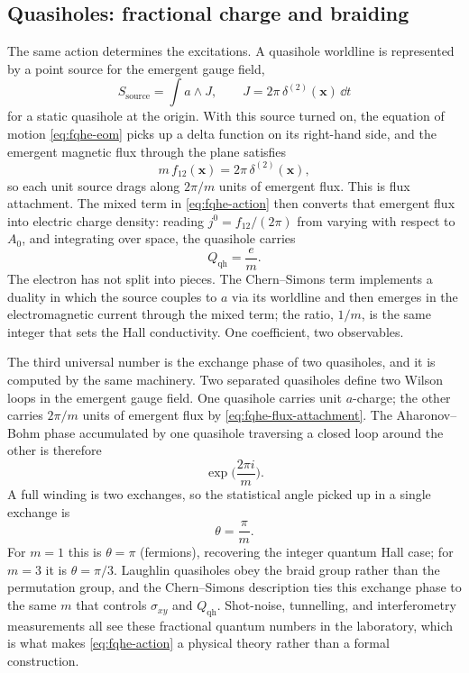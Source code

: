 \subsection{Quasiholes: fractional charge and braiding}
\label{subsec:fqhe-quasiholes}

The same action determines the excitations. A quasihole worldline is represented by a point source for the emergent gauge field,
\begin{equation}
  S_{\mathrm{source}} = \int a\wedge J,
  \qquad
  J = 2\pi\,\delta^{(2)}(\mathbf{x})\,\dd t
  \label{eq:fqhe-source}
\end{equation}
for a static quasihole at the origin. With this source turned on, the equation of motion \eqref{eq:fqhe-eom} picks up a delta function on its right-hand side, and the emergent magnetic flux through the plane satisfies
\begin{equation}
  m\,f_{12}(\mathbf{x}) = 2\pi\,\delta^{(2)}(\mathbf{x}),
  \label{eq:fqhe-flux-attachment}
\end{equation}
so each unit source drags along $2\pi/m$ units of emergent flux. This is flux attachment. The mixed term in \eqref{eq:fqhe-action} then converts that emergent flux into electric charge density: reading $j^0 = f_{12}/(2\pi)$ from varying with respect to $A_0$, and integrating over space, the quasihole carries
\begin{equation}
  Q_{\mathrm{qh}} = \frac{e}{m}.
  \label{eq:fqhe-fractional-charge}
\end{equation}
The electron has not split into pieces. The Chern--Simons term implements a duality in which the source couples to $a$ via its worldline and then emerges in the electromagnetic current through the mixed term; the ratio, $1/m$, is the same integer that sets the Hall conductivity. One coefficient, two observables.

The third universal number is the exchange phase of two quasiholes, and it is computed by the same machinery. Two separated quasiholes define two Wilson loops in the emergent gauge field. One quasihole carries unit $a$-charge; the other carries $2\pi/m$ units of emergent flux by \eqref{eq:fqhe-flux-attachment}. The Aharonov--Bohm phase accumulated by one quasihole traversing a closed loop around the other is therefore
\begin{equation}
  \exp\!\Big(\frac{2\pi i}{m}\Big).
  \label{eq:fqhe-full-winding}
\end{equation}
A full winding is two exchanges, so the statistical angle picked up in a single exchange is
\begin{equation}
  \theta = \frac{\pi}{m}.
  \label{eq:fqhe-statistical-angle}
\end{equation}
For $m=1$ this is $\theta=\pi$ (fermions), recovering the integer quantum Hall case; for $m=3$ it is $\theta=\pi/3$. Laughlin quasiholes obey the braid group rather than the permutation group, and the Chern--Simons description ties this exchange phase to the same $m$ that controls $\sigma_{xy}$ and $Q_{\mathrm{qh}}$. Shot-noise, tunnelling, and interferometry measurements all see these fractional quantum numbers in the laboratory, which is what makes \eqref{eq:fqhe-action} a physical theory rather than a formal construction.

